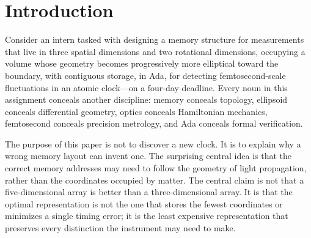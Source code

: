 \documentclass[11pt]{article}
\begin{document}
\begin{abstract}
different $Y$ (Theorem~\ref{thm:factorization}), and spatial aliasing at caustics,
quantization aliasing at finite resolution, and the closed-orbit obstruction are that one
condition violated at three levels. Read this way, preserving $J$ independent branch
identities costs exactly a factor $J^{2}=4^{\log_2 J}$---it is the per-bit price of
identity in the address, not a separate phenomenon---and reserving history bits is free
whenever calibration, rather than address width, is the binding resource.
Synthetic experiments demonstrate
that a spatial-only representation can manufacture apparent timing fluctuations by
merging distinct ray branches at a caustic, and that finite-resolution phase-space
representation converts between-branch variance into within-cell variance by an exactly
quantifiable identity.
The generator, split rule, partition code, and chart table are released so that these
figures are reproducible. We state the limits of what can be established in four days:
machine-checked verification of the complete encoder beyond the released
specification, broadband propagation accuracy, geometric approximation quality, and
metrological benefit remain explicit validation obligations.
\end{abstract}

\tableofcontents

\section{Introduction}\label{sec:intro}

Consider an intern tasked with designing a memory structure for measurements that live
in three spatial dimensions and two rotational dimensions, occupying a volume whose
geometry becomes progressively more elliptical toward the boundary, with contiguous
storage, in Ada, for detecting femtosecond-scale fluctuations in an atomic clock---on a
four-day deadline. Every noun in this assignment conceals another discipline: memory
conceals topology, ellipsoid conceals differential geometry, optics conceals
Hamiltonian mechanics, femtosecond conceals precision metrology, and Ada conceals
formal verification.

The purpose of this paper is not to discover a new clock. It is to explain why a wrong
memory layout can invent one. The surprising central idea is that the correct memory
addresses may need to follow the geometry of light propagation, rather than the
coordinates occupied by matter. The central claim is not that a five-dimensional array
is better than a three-dimensional array. It is that the optimal representation is not
the one that stores the fewest coordinates or minimizes a single timing error; it is
the least expensive representation that preserves every distinction the instrument may
need to make.
\end{document}
